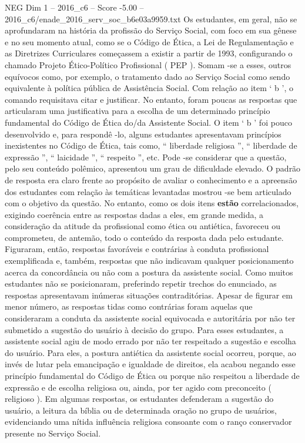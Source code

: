 \begin{textsample}{NEG Dim 1 – 2016\_c6 – Score -5.00 – 2016\_c6/enade\_2016\_serv\_soc\_b6e03a9959.txt}
Os estudantes, em geral, não se aprofundaram na história da profissão do Serviço Social, com foco em sua gênese e no seu momento atual, como se o Código de Ética, a Lei de Regulamentação e as Diretrizes Curriculares começassem a existir a partir de 1993, configurando o chamado Projeto Ético-Político Profissional ( PEP ).
Somam -se a esses, outros equívocos como, por exemplo, o tratamento dado ao Serviço Social como sendo equivalente à política pública de Assistência Social.
Com relação ao item ‘ b ’, o comando requisitava citar e justificar.
No entanto, foram poucas as respostas que articularam uma justificativa para a escolha de um determinado princípio fundamental do Código de Ética do/da Assistente Social.
O item ‘ b ’ foi pouco desenvolvido e, para respondê -lo, alguns estudantes apresentavam princípios inexistentes no Código de Ética, tais como, “ liberdade religiosa ”, “ liberdade de expressão ”, “ laicidade ”, “ respeito ”, etc.
Pode -se considerar que a questão, pelo seu conteúdo polêmico, apresentou um grau de dificuldade elevado.
O padrão de resposta era claro frente ao propósito de avaliar o conhecimento e a apreensão dos estudantes com relação às temáticas levantadas mostrou -se bem articulado com o objetivo da questão.
No entanto, como os dois itens \textbf{estão} correlacionados, exigindo coerência entre as respostas dadas a eles, em grande medida, a consideração da atitude da profissional como ética ou antiética, favoreceu ou comprometeu, de antemão, todo o conteúdo da resposta dada pelo estudante.
Figuraram, então, respostas favoráveis e contrárias à conduta profissional exemplificada e, também, respostas que não indicavam qualquer posicionamento acerca da concordância ou não com a postura da assistente social.
Como muitos estudantes não se posicionaram, preferindo repetir trechos do enunciado, as respostas apresentavam inúmeras situações contraditórias.
Apesar de figurar em menor número, as respostas tidas como contrárias foram aquelas que consideraram a conduta da assistente social equivocada e autoritária por não ter submetido a sugestão do usuário à decisão do grupo.
Para esses estudantes, a assistente social agiu de modo errado por não ter respeitado a sugestão e escolha do usuário.
Para eles, a postura antiética da assistente social ocorreu, porque, ao invés de lutar pela emancipação e igualdade de direitos, ela acabou negando esse princípio fundamental do Código de Ética ou porque não respeitou a liberdade de expressão e de escolha religiosa ou, ainda, por ter agido com preconceito ( religioso ).
Em algumas respostas, os estudantes defenderam a sugestão do usuário, a leitura da bíblia ou de determinada oração no grupo de usuários, evidenciando uma nítida influência religiosa consoante com o ranço conservador presente no Serviço Social.

\end{textsample}

